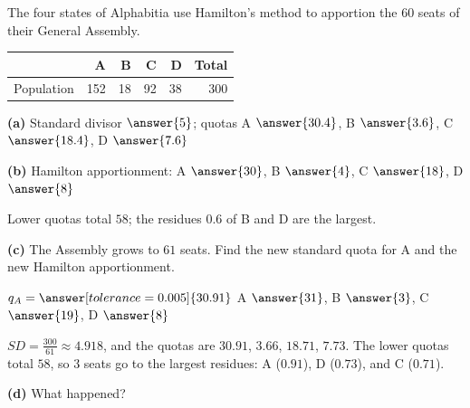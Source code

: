 \documentclass[12pt]{ximera}
\begin{document}
\begin{problem}
The four states of Alphabitia use Hamilton's method to apportion the $60$ seats of their
General Assembly.
\begin{center}
\begin{tabular}{r|rrrrr}
 & A & B & C & D & Total\\\hline
Population & 152 & 18 & 92 & 38 & 300
\end{tabular}
\end{center}

\begin{prompt}
\textbf{(a)} Standard divisor $\answer{5}$; quotas A $\answer{30.4}$, B $\answer{3.6}$,
C $\answer{18.4}$, D $\answer{7.6}$
\end{prompt}

\begin{prompt}
\textbf{(b)} Hamilton apportionment: A $\answer{30}$, B $\answer{4}$, C $\answer{18}$,
D $\answer{8}$
\begin{feedback}
Lower quotas total $58$; the residues $0.6$ of B and D are the largest.
\end{feedback}
\end{prompt}

\begin{prompt}
\textbf{(c)} The Assembly grows to $61$ seats. Find the new standard quota for A and the
new Hamilton apportionment.

$q_A=\answer[tolerance=0.005]{30.91}$ \qquad A $\answer{31}$, B $\answer{3}$,
C $\answer{19}$, D $\answer{8}$
\begin{feedback}
$SD=\frac{300}{61}\approx4.918$, and the quotas are $30.91$, $3.66$, $18.71$, $7.73$. The
lower quotas total $58$, so $3$ seats go to the largest residues: A ($0.91$), D ($0.73$),
and C ($0.71$).
\end{feedback}
\end{prompt}

\begin{prompt}
\textbf{(d)} What happened?
\begin{multipleChoice}
\end{multipleChoice}
\end{prompt}
\end{problem}
\end{document}
